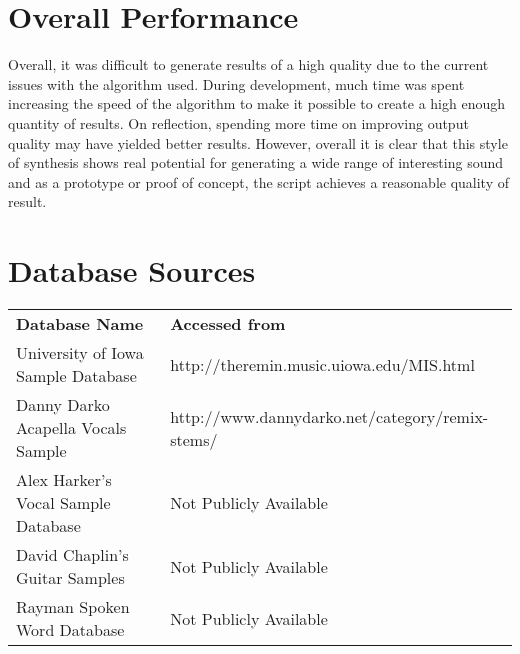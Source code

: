 \documentclass{scrartcl}
\begin{document}
    \section{Overall Performance}
    Overall, it was difficult to generate results of a high quality due to the
    current issues with the algorithm used. During development, much time was
    spent increasing the speed of the algorithm to make it possible to create a
    high enough quantity of results. On reflection, spending more time on
    improving output quality may have yielded better results. However,
    overall it is clear that this style of synthesis shows real potential for
    generating a wide range of interesting sound and as a prototype or proof of
    concept, the script achieves a reasonable quality of result.

    \section{Database Sources}
    \begin{table}[H]
    \centering
    \label{my-label}
    \begin{tabular}{ll}
        \textbf{Database Name}                       & \textbf{Accessed from}                            \\
        University of Iowa Sample Database  & http://theremin.music.uiowa.edu/MIS.html \\
        Danny Darko Acapella Vocals Sample & http://www.dannydarko.net/category/remix-stems/\\
        Alex Harker's Vocal Sample Database & Not Publicly Available                   \\
        David Chaplin's Guitar Samples      & Not Publicly Available  \\
        Rayman Spoken Word Database      & Not Publicly Available                  
    \end{tabular}
    \end{table}
\end{document}
